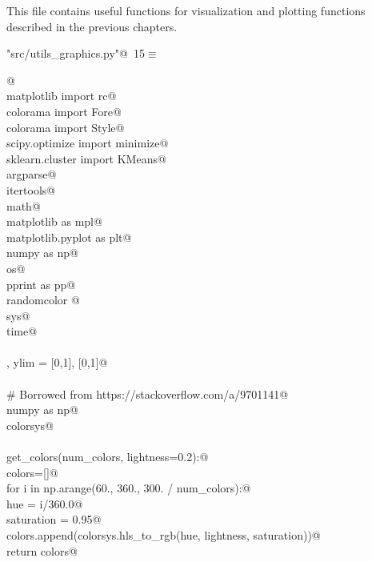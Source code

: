\documentclass[12pt, english, oneside]{report}
\begin{document}
\begin{appendices}
This file contains useful functions for visualization and plotting functions described in the previous chapters.
\begin{flushleft} \small\label{scrap3}\raggedright\small
{} \verb@"src/utils_graphics.py"@\nobreak\ {\footnotesize {15}}$\equiv$
\vspace{-1ex}
\begin{list}{}{} \item
\mbox{}\verb@    @\\
\mbox{}\verb@from matplotlib import rc@\\
\mbox{}\verb@from colorama import Fore@\\
\mbox{}\verb@from colorama import Style@\\
\mbox{}\verb@from scipy.optimize import minimize@\\
\mbox{}\verb@from sklearn.cluster import KMeans@\\
\mbox{}\verb@import argparse@\\
\mbox{}\verb@import itertools@\\
\mbox{}\verb@import math@\\
\mbox{}\verb@import matplotlib as mpl@\\
\mbox{}\verb@import matplotlib.pyplot as plt@\\
\mbox{}\verb@import numpy as np@\\
\mbox{}\verb@import os@\\
\mbox{}\verb@import pprint as pp@\\
\mbox{}\verb@import randomcolor @\\
\mbox{}\verb@import sys@\\
\mbox{}\verb@import time@\\
\mbox{}\verb@@\\
\mbox{}\verb@xlim, ylim = [0,1], [0,1]@\\
\mbox{}\verb@@\\
\mbox{}\verb@# Borrowed from https://stackoverflow.com/a/9701141@\\
\mbox{}\verb@import numpy as np@\\
\mbox{}\verb@import colorsys@\\
\mbox{}\verb@@\\
\mbox{}\verb@def get_colors(num_colors, lightness=0.2):@\\
\mbox{}\verb@    colors=[]@\\
\mbox{}\verb@    for i in np.arange(60., 360., 300. / num_colors):@\\
\mbox{}\verb@        hue        = i/360.0@\\
\mbox{}\verb@        saturation = 0.95@\\
\mbox{}\verb@        colors.append(colorsys.hls_to_rgb(hue, lightness, saturation))@\\
\mbox{}\verb@    return colors@\\
\mbox{}\verb@@{\NWsep}
\end{list}
\vspace{-1.5ex}
\footnotesize
\begin{list}{}{\setlength{\itemsep}{-\parsep}\setlength{\itemindent}{-\leftmargin}}


\end{list}
\end{flushleft}
\end{appendices}
\end{document}
